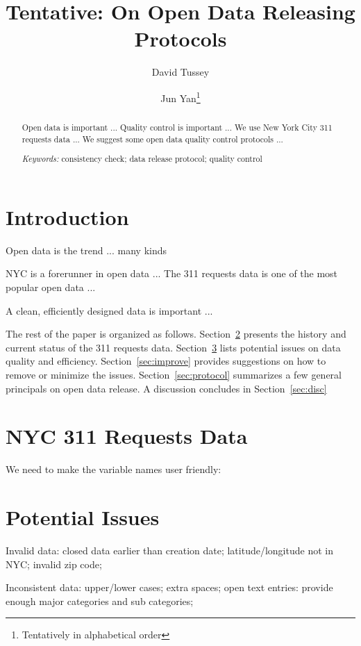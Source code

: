 \documentclass[12pt, titlepage]{article}
\title{Tentative: On Open Data Releasing Protocols}
\date{}
\author[1]{David Tussey}
\author[2]{Jun Yan\thanks{Tentatively in alphabetical order}}
\affil[1]{Independent Researcher?}
\affil[2]{Department of Statistics, University of Connecticut}
\begin{document}
\maketitle


\begin{abstract}
  Open data is important ...
  Quality control is important ...
  We use New York City 311 requests data  ...
  We suggest some open data quality control protocols ...


\bigskip
  
\noindent
{\it Keywords:}
consistency check;    
data release protocol;
quality control
\end{abstract}



\section{Introduction} \label{sec:intro}

Open data is the trend ... many kinds \citep{barns2016mine}


NYC is a forerunner in open data ... The 311 requests data is one of the most
popular open data ...


A clean, efficiently designed data is important ...


The rest of the paper is organized as follows.
Section~\ref{sec:data} presents the history and current status of the 311
requests data. Section~\ref{sec:issues} lists potential issues on data quality
and efficiency.
Section~\ref{sec:improve} provides suggestions on how to remove or minimize the
issues.
Section~\ref{sec:protocol} summarizes a few general principals on open data
release.
A discussion concludes in Section~\ref{sec:disc}


\section{NYC 311 Requests Data} \label{sec:data}

We need to make the variable names user friendly:


\section{Potential Issues} \label{sec:issues}

Invalid data: closed data earlier than creation date;
latitude/longitude not in NYC; invalid zip code;


Inconsistent data: upper/lower cases; extra spaces; 
open text entries: provide enough major categories and sub categories;
\end{document}
